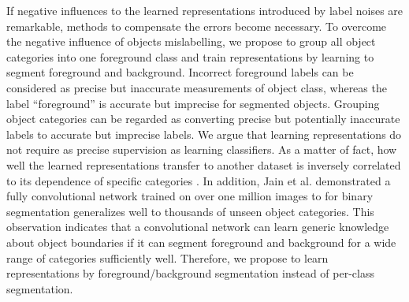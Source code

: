 
If negative influences to the learned representations introduced by label noises are remarkable, methods to compensate the errors become necessary.
To overcome the negative influence of objects mislabelling, we propose to group all object categories into one foreground class and train representations by learning to segment foreground and background.
Incorrect foreground labels can be considered as precise but inaccurate measurements of object class, whereas the label ``foreground'' is accurate but imprecise for segmented objects.
Grouping object categories can be regarded as converting precise but potentially inaccurate labels to accurate but imprecise labels.
We argue that learning representations do not require as precise supervision as learning classifiers.
As a matter of fact, how well the learned representations transfer to another dataset is inversely correlated to its dependence of specific categories \cite{yosinski2014transferable}.
In addition, Jain et al. \cite{jain2017pixel} demonstrated a fully convolutional network trained on over one million images to for binary segmentation generalizes well to thousands of unseen object categories.
This observation indicates that a convolutional network can learn generic knowledge about object boundaries if it can segment foreground and background for a wide range of categories sufficiently well.
Therefore, we propose to learn representations by foreground/background segmentation instead of per-class segmentation.





